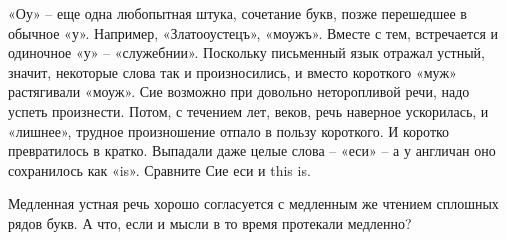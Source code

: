 «Оу» – еще одна любопытная штука, сочетание букв, позже перешедшее в обычное «у». Например, «Златооустецъ», «моужъ». Вместе с тем, встречается и одиночное «у» – «служебнии». Поскольку письменный язык отражал устный, значит, некоторые слова так и произносились, и вместо короткого «муж» растягивали «моуж». Сие возможно при довольно неторопливой речи, надо успеть произнести. Потом, с течением лет, веков, речь наверное ускорилась, и «лишнее», трудное произношение отпало в пользу короткого. И коротко превратилось в кратко. Выпадали даже целые слова – «еси» – а у англичан оно сохранилось как «is». Сравните Сие еси и this is. 

Медленная устная речь хорошо согласуется с медленным же чтением сплошных рядов букв. А что, если и мысли в то время протекали медленно? 

